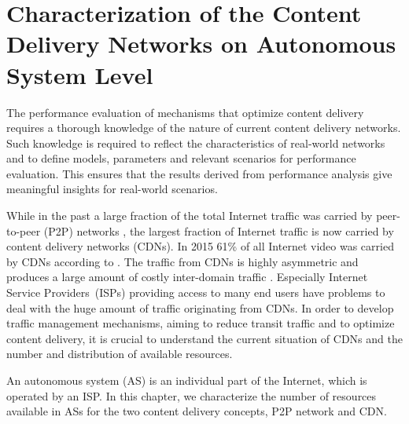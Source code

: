 \chapter{Characterization of the Content Delivery Networks on Autonomous System Level}\label{chap:aslevel}

The performance evaluation of mechanisms that optimize content delivery requires a thorough knowledge of the nature of current content delivery networks.
Such knowledge is required to reflect the characteristics of real-world networks and to define models, parameters and relevant scenarios for performance evaluation.
This ensures that the results derived from performance analysis give meaningful insights for real-world scenarios.


While in the past a large fraction of the total Internet traffic was carried by peer-to-peer (P2P) networks \cite{Cisc09}, the largest fraction of Internet traffic is now carried by content delivery networks (CDNs).
In 2015 61\% of all Internet video was carried by CDNs according to \cite{cisco2016}.
The traffic from CDNs is highly asymmetric and produces a large amount of costly inter-domain traffic \cite{labovitz2010internet}. Especially Internet Service Providers~(ISPs) providing access to many end users have problems to deal with the huge amount of traffic originating from CDNs.
In order to develop traffic management mechanisms, aiming to reduce transit traffic and to optimize content delivery, it is crucial to understand the current situation of CDNs and the number and distribution of available resources.


An autonomous system (AS) is an individual part of the Internet, which is operated by an ISP.
In this chapter, we characterize the number of resources available
in ASs
for the two content delivery concepts, P2P network and CDN.

